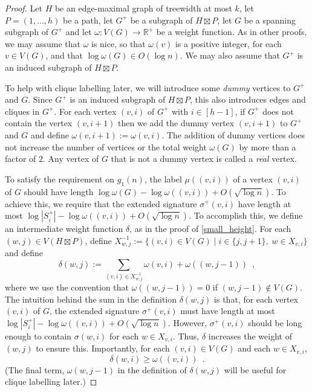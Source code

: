 \documentclass[twoside,leqno]{article}
\newcommand{\R}{\mathbb{R}}
\renewcommand{\ge}{\geqslant}
\newcommand{\defin}[1]{\emph{\textcolor{brightmaroon}{#1}}}
\newcommand{\Oh}{O}
\begin{document}
\begin{proof}
    Let $H$ be an edge-maximal graph of treewidth at most $k$, let $P=(1,\ldots,h)$ be a path, let $G^+$ be a subgraph of $H\boxtimes P$, let $G$ be a spanning subgraph of $G^+$ and let $\omega:V(G)\to\R^+$ be a weight function.  As in other proofs, we may assume that $\omega$ is nice, so that $\omega(v)$ is a positive integer, for each $v\in V(G)$, and that $\log\omega(G)\in\Oh(\log n)$.  We may also assume that $G^+$ is an induced subgraph of $H\boxtimes P$.

    To help with clique labelling later, we will introduce some \defin{dummy} vertices to $G^+$ and $G$.  Since $G^+$ is an induced subgraph of $H\boxtimes P$, this also introduces edges and cliques in $G^+$.  For each vertex $(v,i)$ of $G^+$ with $i\in[h-1]$, if $G^+$ does not contain the vertex $(v,i+1)$ then we add the dummy vertex $(v,i+1)$ to $G^+$ and $G$ and define $\omega(v,i+1):=\omega(v,i)$.  The addition of dummy vertices does not increase the number of vertices or the total weight $\omega(G)$ by more than a factor of $2$.  Any vertex of $G$ that is not a dummy vertex is called a \defin{real} vertex.

    To satisfy the requirement on $g_1(n)$, the label $\mu((v,i))$ of a vertex $(v,i)$ of $G$ should have length $\log \omega(G)-\log\omega((v,i)) + \Oh(\sqrt{\log n})$.  To achieve this, we require that the extended signature $\sigma^+(v,i)$ have length at most $\log|S_i^+|-\log\omega((v,i)) + \Oh(\sqrt{\log n})$.  To accomplish this, we define an intermediate weight function $\delta$, as in the proof of \cref{small_height}.  For each $(w,j)\in V(H\boxtimes P)$, define $X^{-1}_{w,j}:=\{(v,i)\in V(G)\mid i\in\{j,j+1\},\; w\in X_{v,i}\}$ and define
    \[
      \delta(w,j):=\sum_{(v,i)\in X^{-1}_{w,j}}\omega(v,i) + \omega((w,j-1)) \enspace ,
    \]
    where we use the convention that $\omega((w,j-1))=0$ if $(w,j-1)\not\in V(G)$.
    The intuition behind the sum in the definition $\delta(w,j)$ is that, for each vertex $(v,i)$ of $G$, the extended signature $\sigma^+(v,i)$ must have length at most $\log|S^+_i|-\log\omega((v,i))+\Oh(\sqrt{\log n})$.  However, $\sigma^+(v,i)$ should be long enough to contain $\sigma(w,i)$ for each $w\in X_{v,i}$.  Thus, $\delta$ increases the weight of $(w,j)$ to ensure this.
    Importantly, for each $(v,i)\in V(G)$ and each $w\in X_{v,i}$,
    \begin{equation}
      \delta(w,i) \ge \omega((v,i)) \enspace . \label{delta_v_omega}
    \end{equation}
    (The final term, $\omega(w,j-1)$ in the definition of $\delta(w,j)$ will be useful for clique labelling later.)


\end{proof}
\end{document}
